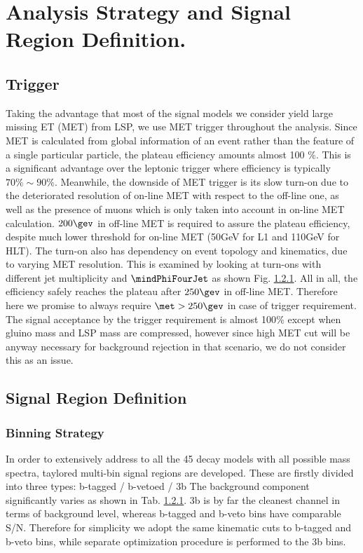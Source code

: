 \section{Analysis Strategy and Signal Region Definition.} 

\subsection{Trigger}
Taking the advantage that most of the signal models we consider yield large missing ET (MET) from LSP, we use MET trigger throughout the analysis.
Since MET is calculated from global information of an event rather than the feature of a single particular particle, the plateau efficiency amounts almost 100 $\%$. 
This is a significant advantage over the leptonic trigger where efficiency is typically $70\% \sim 90\%$.
Meanwhile, the downside of MET trigger is its slow turn-on due to the deteriorated resolution of on-line MET with respect to the off-line one, as well as the presence of muons which is only taken into account in on-line MET calculation.
$200 \gev$ in off-line MET is required to assure the plateau efficiency, despite much lower threshold for on-line MET (50GeV for L1 and 110GeV for HLT).
The turn-on also has dependency on event topology and kinematics, due to varying MET resolution. 
This is examined by looking at turn-ons with different jet multiplicity and $\mindPhiFourJet$ as shown Fig. \ref{}.
All in all, the efficiency safely reaches the plateau after $250 \gev$ in off-line MET. 
Therefore here we promise to always require $\met > 250 \gev$ in case of trigger requirement.
The signal acceptance by the trigger requirement is almost 100$\%$ except when gluino mass and LSP mass are compressed, however since high MET cut will be anyway necessary for background rejection in that scenario, we do not consider this as an issue.



\subsection{Signal Region Definition}


\subsubsection{Binning Strategy}
In order to extensively address to all the 45 decay models with all possible mass spectra, taylored multi-bin signal regions are developed.
These are firstly divided into three types: b-tagged / b-vetoed / 3b
The background component significantly varies as shown in Tab. \ref{}.
3b is by far the cleanest channel in terms of background level, whereas b-tagged and b-veto bins have comparable S/N.
Therefore for simplicity we adopt the same kinematic cuts to b-tagged and b-veto bins, while separate optimization procedure is performed to the 3b bins. \\

